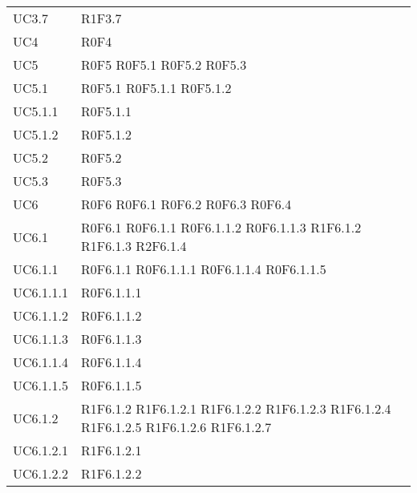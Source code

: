 \begin{longtable}{p{2.5cm}!{\VRule[1pt]}p{2.5cm}}
UC3.7 & R1F3.7\\
UC4 & R0F4\\
UC5 & R0F5
	\newline R0F5.1
	\newline R0F5.2
	\newline R0F5.3\\
UC5.1 & R0F5.1
	\newline R0F5.1.1
	\newline R0F5.1.2\\	
UC5.1.1 & R0F5.1.1\\
UC5.1.2 & R0F5.1.2\\
UC5.2 & R0F5.2\\
UC5.3 & R0F5.3\\
UC6 & R0F6
	\newline R0F6.1
	\newline R0F6.2
	\newline R0F6.3
	\newline R0F6.4\\
UC6.1 & R0F6.1
	\newline R0F6.1.1
	\newline R0F6.1.1.2
	\newline R0F6.1.1.3
	\newline R1F6.1.2
	\newline R1F6.1.3
	\newline R2F6.1.4\\
UC6.1.1 & R0F6.1.1
	\newline R0F6.1.1.1
	\newline R0F6.1.1.4
	\newline R0F6.1.1.5\\
UC6.1.1.1 & R0F6.1.1.1\\
UC6.1.1.2 & R0F6.1.1.2\\
UC6.1.1.3 & R0F6.1.1.3\\
UC6.1.1.4 & R0F6.1.1.4\\
UC6.1.1.5 & R0F6.1.1.5\\
UC6.1.2 & R1F6.1.2
	\newline R1F6.1.2.1
	\newline R1F6.1.2.2
	\newline R1F6.1.2.3
	\newline R1F6.1.2.4
	\newline R1F6.1.2.5
	\newline R1F6.1.2.6
	\newline R1F6.1.2.7\\
UC6.1.2.1 & R1F6.1.2.1\\
UC6.1.2.2 & R1F6.1.2.2\\

\end{longtable}
